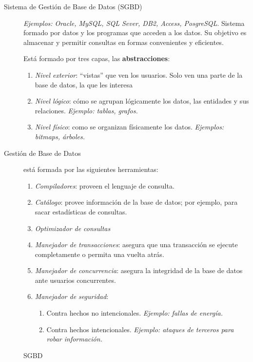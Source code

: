 \documentclass[a4paper, twoside]{article}
\begin{document}
\begin{description}
	\item[Sistema de Gestión de Base de Datos (SGBD)] \emph{Ejemplos: Oracle, MySQL, SQL Sever, DB2, Access, PosgreSQL}. Sistema formado por datos y los programas que acceden a los datos. Su objetivo es almacenar y permitir consultas en formas convenientes y eficientes.

	Está formado por tres capas, las \textbf{abstracciones}:
	\begin{enumerate}
		\item \emph{Nivel exterior}: ``vistas'' que ven los usuarios. Solo ven una parte de la base de datos, la que les interesa
		\item \emph{Nivel lógico}: cómo se agrupan lógicamente los datos, las entidades y sus relaciones. \emph{Ejemplo: tablas, grafos.}
		\item \emph{Nivel físico}: como se organizan físicamente los datos. \emph{Ejemplos: bitmaps, árboles.}
	\end{enumerate}

	\item[Gestión de Base de Datos] está formada por las siguientes herramientas:
	\begin{enumerate}
		\item \emph{Compiladores}: proveen el lenguaje de consulta.
		\item \emph{Catálogo}: provee información de la base de datos; por ejemplo, para sacar estadísticas de consultas.
		\item \emph{Optimizador de consultas}
		\item \emph{Manejador de transacciones}: asegura que una transacción se ejecute completamente o permita una vuelta atrás.
		\item \emph{Manejador de concurrencia}: asegura la integridad de la base de datos ante usuarios concurrentes.
		\item \emph{Manejador de seguridad}: 
		\begin{enumerate}
			\item Contra hechos no intencionales. \emph{Ejemplo: fallas de energía.}
			\item Contra hechos intencionales. \emph{Ejemplo: ataques de terceros para robar información.}
		\end{enumerate}
	\end{enumerate}
\end{description}

\begin{figure}[H]
	\caption{SGBD}
\end{figure}
\end{document}
